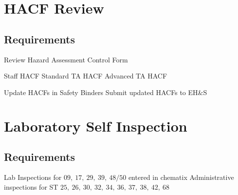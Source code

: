 \documentclass[justified]{tufte-book}
\begin{document}
\newpage
\section{\bf HACF Review}
\subsection{Requirements}
\begin{itemize}
	\Item Review Hazard Assessment Control Form
	\begin{itemize}
		\Item Staff HACF
		\Item Standard TA HACF
		\Item Advanced TA HACF
	\end{itemize}
	\Item Update HACFs in Safety Binders
	\Item Submit updated HACFs to EH\&S
\end{itemize}

\section{\bf Laboratory Self Inspection}
\subsection{Requirements}
\begin{itemize}
	\Item Lab Inspections for $09,\ 17,\ 29,\ 39,\ 48/50$ entered in chematix
	\Item Administrative inspections for ST $25,\ 26,\ 30,\ 32,\ 34,\ 36,\ 37,\ 38,\ 42,\ 68$
\end{itemize}
\end{document}
